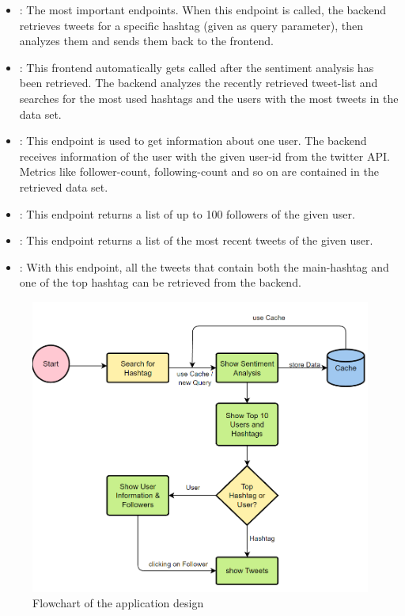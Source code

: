 \documentclass[a4paper,oneside,11pt]{scrreprt}
\begin{document}
\begin{itemize}
    \item {}: The most important endpoints. When this endpoint is called, the backend retrieves tweets for a specific hashtag (given as query parameter), then analyzes them and sends them back to the frontend.
    \item {}: This frontend automatically gets called after the sentiment analysis has been retrieved. The backend analyzes the recently retrieved tweet-list and searches for the most used hashtags and the users with the most tweets in the data set.
    \item {}: This endpoint is used to get information about one user. The backend receives information of the user with the given user-id from the twitter API. Metrics like follower-count, following-count and so on are contained in the retrieved data set.
    \item {}: This endpoint returns a list of up to 100 followers of the given user.
    \item {}: This endpoint returns a list of the most recent tweets of the given user.
    \item {}: With this endpoint, all the tweets that contain both the main-hashtag and one of the top hashtag can be retrieved from the backend.
\end{itemize}

\begin{figure}[H]
    \centering
    \caption{Flowchart of the application design}
    \includegraphics[width=\textwidth]{media/2_Design.png}
\end{figure}
\end{document}
